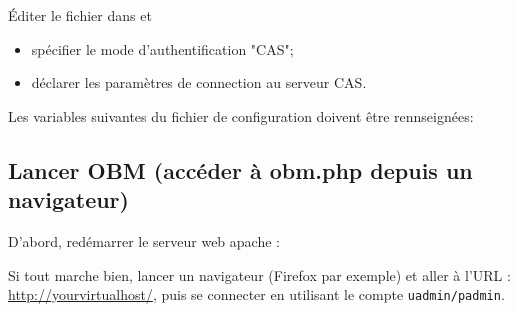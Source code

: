 Éditer le fichier  dans  et

\begin{itemize}
\item spécifier le mode d'authentification "CAS"; 
\item déclarer les paramètres de connection au serveur CAS.
\end{itemize}

Les variables suivantes du fichier de configuration doivent être rennseignées:


\subsection{Lancer OBM (accéder à obm.php depuis un navigateur)}

D'abord, redémarrer le serveur web apache : 


Si tout marche bien, lancer un navigateur (Firefox par exemple) et
aller à l'URL : \url{http://yourvirtualhost/}, puis se connecter en
utilisant le compte \texttt{uadmin/padmin}.

